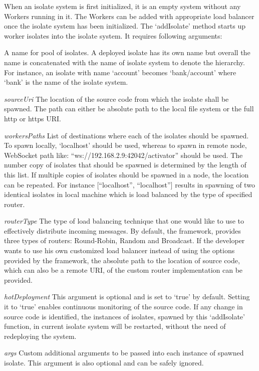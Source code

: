   When an isolate system is first initialized, it is an empty system without any Workers running in it. The Workers can be added with appropriate load balancer once the isolate system has been initialized. The ‘addIsolate’ method starts up worker isolates into the isolate system. It requires following arguments:
  \begin{description}
    \item[\itshape{name}] \textendash{} A name for pool of isolates. A deployed isolate has its own name but overall the name is concatenated with the name of isolate system to denote the hierarchy. For instance, an isolate with name ‘account’ becomes ‘bank/account’ where ‘bank’ is the name of the isolate system.
    \item{\itshape{sourceUri}} \textendash{} The location of the source code from which the isolate shall be spawned. The path can either be absolute path to the local file system or the full http or https URI.
    \item{\itshape{workersPaths}} \textendash{} List of destinations where each of the isolates should be spawned. To spawn locally, ‘localhost’ should be used, whereas to spawn in remote node, WebSocket path like: “ws://192.168.2.9:42042/activator” should be used. The number copy of isolates that should be spawned is determined by the length of this list. If multiple copies of isolates should be spawned in a node, the location can be repeated. For instance [“localhost”, “localhost”] results in spawning of two identical isolates in local machine which is load balanced by the type of specified router.
    \item{\itshape{routerType}} \textendash{} The type of load balancing technique that one would like to use to effectively distribute incoming messages. By default, the framework, provides three types of routers: Round-Robin, Random and Broadcast. If the developer wants to use his own customized load balancer instead of using the options provided by the framework, the absolute path to the location of source code, which can also be a remote URI, of the custom router implementation can be provided.
    \item{\itshape{hotDeployment}} \textendash{} This argument is optional and is set to ‘true’ by default. Setting it to ‘true’ enables continuous monitoring of the source code. If any change in source code is identified, the  instances of isolates, spawned by this ‘addIsolate’ function, in current isolate system will be restarted, without the need of redeploying the system.
    \item{\itshape{args}} \textendash{} Custom additional arguments to be passed into each instance of spawned isolate. This argument is also optional and can be safely ignored.
  \end{description}

